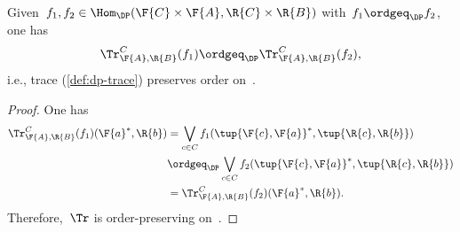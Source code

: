 \begin{lemma}
  Given~$f_1,f_2\in \Hom_\DP(\F{C}\times \F{A},\R{C}\times \R{B})$ with~$f_1\ordgeq_\DP f_2$, one has
  \begin{equation}
    \Tr_{\F{A},\R{B}}^C(f_1)\ordgeq_\DP \Tr_{\F{A},\R{B}}^C(f_2),
  \end{equation}
  i.e., trace (\cref{def:dp-trace}) preserves order on~\DP.
\end{lemma}

\begin{proof}
  One has
  \begin{equation}
    \begin{aligned}
      \Tr_{\F{A},\R{B}}^C(f_1)(\F{a}^*,\R{b})&=\bigvee_{c\in C}f_1(\tup{\F{c},\F{a}}^*,\tup{\R{c},\R{b}})\\
      &\ordgeq_\DP \bigvee_{c\in C}f_2(\tup{\F{c},\F{a}}^*,\tup{\R{c},\R{b}})\\
      &=\Tr_{\F{A},\R{B}}^C(f_2)(\F{a}^*,\R{b}).
    \end{aligned}
  \end{equation}
  Therefore,~$\Tr$ is order-preserving on~\DP.
\end{proof}
